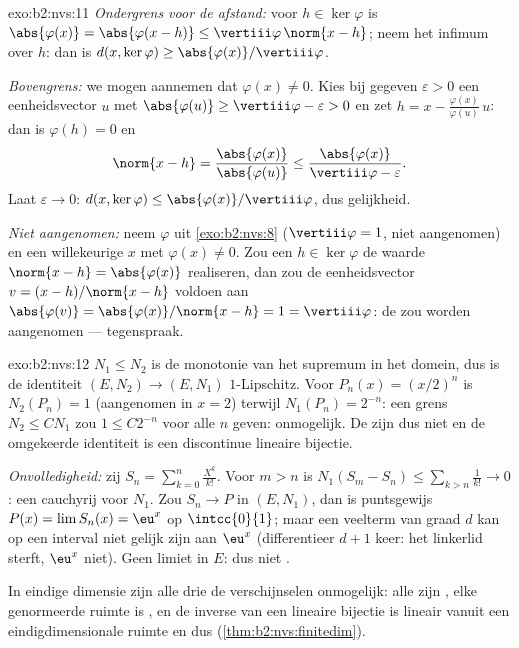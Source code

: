 \begin{solution}{exo:b2:nvs:11}
\emph{Ondergrens voor de afstand:} voor $h \in \ker\varphi$ is
$\abs{\varphi(x)} = \abs{\varphi(x - h)} \leq
\vertiii\varphi\,\norm{x - h}$; neem het infimum over $h$: dan is
$d(x, \ker\varphi) \geq \abs{\varphi(x)}/\vertiii\varphi$.

\emph{Bovengrens:} we mogen aannemen dat $\varphi(x) \neq 0$. Kies
bij gegeven $\varepsilon > 0$ een eenheidsvector $u$ met
$\abs{\varphi(u)} \geq \vertiii\varphi - \varepsilon > 0$ en zet $h
= x - \frac{\varphi(x)}{\varphi(u)}\,u$: dan is $\varphi(h) = 0$ en
\[
\norm{x - h} = \frac{\abs{\varphi(x)}}{\abs{\varphi(u)}}
\leq \frac{\abs{\varphi(x)}}{\vertiii\varphi - \varepsilon}.
\]
Laat $\varepsilon \to 0$: $d(x, \ker\varphi) \leq
\abs{\varphi(x)}/\vertiii\varphi$, dus gelijkheid.

\emph{Niet aangenomen:} neem $\varphi$ uit \cref{exo:b2:nvs:8}
($\vertiii\varphi = 1$, niet aangenomen) en een willekeurige $x$
met $\varphi(x) \neq 0$. Zou een $h \in \ker\varphi$ de waarde
$\norm{x - h} = \abs{\varphi(x)}$ realiseren, dan zou de
eenheidsvector $v = (x - h)/\norm{x - h}$ voldoen aan
$\abs{\varphi(v)} = \abs{\varphi(x)}/\norm{x - h} = 1 =
\vertiii\varphi$: de  zou worden aangenomen ---
tegenspraak.
\end{solution}

\begin{solution}{exo:b2:nvs:12}
$N_1 \leq N_2$ is de monotonie van het supremum in het domein, dus
is de identiteit $(E, N_2) \to (E, N_1)$ $1$-Lipschitz. Voor
$P_n(x) = (x/2)^n$ is $N_2(P_n) = 1$ (aangenomen in $x = 2$)
terwijl $N_1(P_n) = 2^{-n}$: een grens $N_2 \leq CN_1$ zou $1 \leq
C2^{-n}$ voor alle $n$ geven: onmogelijk. De  zijn dus niet
 en de omgekeerde identiteit is een discontinue lineaire
bijectie.

\emph{Onvolledigheid:} zij $S_n = \sum_{k=0}^{n}\frac{X^k}{k!}$.
Voor $m > n$ is $N_1(S_m - S_n) \leq \sum_{k>n}\frac1{k!} \to 0$:
een cauchyrij voor $N_1$. Zou $S_n \to P$ in $(E, N_1)$, dan is
puntsgewijs $P(x) = \lim S_n(x) = \eu^x$ op $\intcc{0}{1}$; maar
een veelterm van graad $d$ kan op een interval niet gelijk zijn aan
$\eu^x$ (differentieer $d + 1$ keer: het linkerlid sterft, $\eu^x$
niet). Geen limiet in $E$: dus niet .

In eindige dimensie zijn alle drie de verschijnselen onmogelijk:
alle  zijn , elke genormeerde ruimte is ,
en de inverse van een lineaire bijectie is lineair vanuit een
eindigdimensionale ruimte en dus 
(\cref{thm:b2:nvs:finitedim}).
\end{solution}

